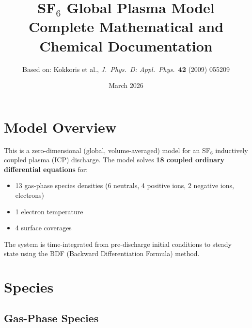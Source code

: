 \documentclass[11pt,a4paper]{article}
\title{\textbf{SF$_6$ Global Plasma Model}\\[6pt]
\large Complete Mathematical and Chemical Documentation}
\author{Based on: Kokkoris et al., \textit{J.\ Phys.\ D: Appl.\ Phys.}\ \textbf{42} (2009) 055209}
\date{March 2026}
\begin{document}
\maketitle
\tableofcontents
\newpage

\section{Model Overview}

This is a zero-dimensional (global, volume-averaged) model for an SF$_6$ inductively coupled plasma (ICP) discharge. The model solves \textbf{18 coupled ordinary differential equations} for:
\begin{itemize}[nosep]
  \item 13 gas-phase species densities (6 neutrals, 4 positive ions, 2 negative ions, electrons)
  \item 1 electron temperature
  \item 4 surface coverages
\end{itemize}
The system is time-integrated from pre-discharge initial conditions to steady state using the BDF (Backward Differentiation Formula) method.

\section{Species}

\subsection{Gas-Phase Species}
\end{document}

